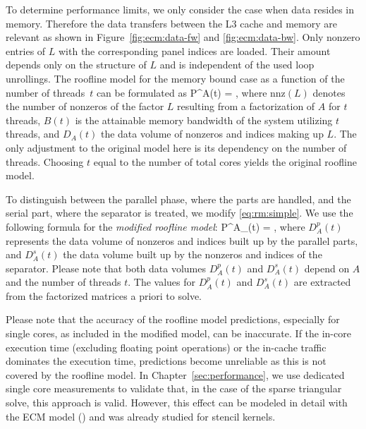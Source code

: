To determine performance limits, we only consider the case when data resides in
memory.
Therefore the data transfers between the L3 cache and memory are relevant as shown
in Figure~\ref{fig:ecm:data-fw} and \ref{fig:ecm:data-bw}.
Only nonzero entries of $L$ with the corresponding panel indices are loaded. 
Their amount depends only on the structure of $L$ and is independent of the used
loop unrollings.
%
The roofline model for the memory bound case as a function of the number of
threads~$t$ can be formulated as
%
\be
  \label{eq:rm:simple}
  P^{A}(t)
  =  \quad {},
\ee
%
where $\text{nnz}(L)$ denotes the number of nonzeros of the factor $L$ 
resulting from a factorization of $A$ for $t$ threads, 
$B(t)$ is the attainable memory bandwidth of the system utilizing $t$ threads, and 
$D_A(t)$ the data volume of nonzeros and indices making up $L$.
The only adjustment to the original model here is its dependency on the number
of threads. 
Choosing $t$ equal to the number of total cores yields the original roofline model.

To distinguish between the parallel phase, where the parts are handled,
and the serial part, where the separator is treated, we modify 
\eqref{eq:rm:simple}.
We use the following formula for the \textit{modified roofline model}: 
%
\be
  \label{eq:rm:mod}
  P^{A}_{}(t) 
  =  \quad {},
\ee
%
where
$D_A^p(t)$ 
represents
the data volume of nonzeros and indices %
built up
by the parallel parts, and $D_A^s(t)$ the data volume %
built up by the nonzeros and
indices of the separator.
%
Please note that both data volumes $D_A^p(t)$ and $D_A^s(t)$ depend on
$A$ and the number of threads $t$.
%
The values for $D_A^p(t)$ and $D_A^s(t)$ are extracted from the factorized
matrices a priori to solve.

Please note that the accuracy of the roofline model predictions, especially for
single cores, as included in the modified model, can be inaccurate. 
If the in-core execution time (excluding floating point operations) or the in-cache
traffic dominates the execution time, predictions become unreliable as this is not
covered by the roofline model.
In Chapter~\ref{sec:performance}, we use dedicated single core measurements to
validate that, in the case of the sparse triangular solve,
this approach is valid. 
%
However, this effect can be modeled in detail with the ECM
model (\cite{treibig-2010-ecm, hager-2012-ecm, stengel-2015}) and was already
studied for stencil kernels.


